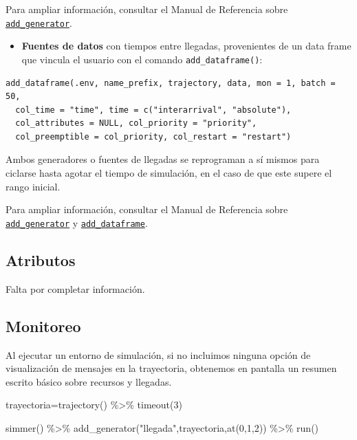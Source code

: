\documentclass[
]{book}
\newenvironment{Shaded}{\begin{snugshade}}{\end{snugshade}}
\newcommand{\DecValTok}[1]{\textcolor[rgb]{0.00,0.00,0.81}{#1}}
\newcommand{\FunctionTok}[1]{\textcolor[rgb]{0.00,0.00,0.00}{#1}}
\newcommand{\NormalTok}[1]{#1}
\newcommand{\OtherTok}[1]{\textcolor[rgb]{0.56,0.35,0.01}{#1}}
\newcommand{\SpecialCharTok}[1]{\textcolor[rgb]{0.00,0.00,0.00}{#1}}
\newcommand{\StringTok}[1]{\textcolor[rgb]{0.31,0.60,0.02}{#1}}
\providecommand{\tightlist}{%
  \setlength{\itemsep}{0pt}\setlength{\parskip}{0pt}}
\theoremstyle{definition}
\theoremstyle{definition}
\theoremstyle{definition}
\theoremstyle{definition}
\theoremstyle{remark}
\begin{document}
Para ampliar información, consultar el Manual de Referencia sobre \href{https://r-simmer.org/reference/generators.html}{\texttt{add\_generator}}.

\begin{itemize}
\tightlist
\item
  \textbf{Fuentes de datos} con tiempos entre llegadas, provenientes de un data frame que vincula el usuario con el comando \texttt{add\_dataframe()}:
\end{itemize}

\begin{verbatim}
add_dataframe(.env, name_prefix, trajectory, data, mon = 1, batch = 50,
  col_time = "time", time = c("interarrival", "absolute"),
  col_attributes = NULL, col_priority = "priority",
  col_preemptible = col_priority, col_restart = "restart")
\end{verbatim}

Ambos generadores o fuentes de llegadas se reprograman a sí mismos para ciclarse hasta agotar el tiempo de simulación, en el caso de que este supere el rango inicial.

Para ampliar información, consultar el Manual de Referencia sobre \href{https://r-simmer.org/reference/add_generator.html}{\texttt{add\_generator}} y \href{https://r-simmer.org/reference/add_dataframe.html}{\texttt{add\_dataframe}}.

\hypertarget{atributos}{%
\subsection{Atributos}\label{atributos}}

Falta por completar información.

\hypertarget{monitoreo}{%
\subsection{Monitoreo}\label{monitoreo}}

Al ejecutar un entorno de simulación, si no incluimos ninguna opción de visualización de mensajes en la trayectoria, obtenemos en pantalla un resumen escrito básico sobre recursos y llegadas.

\begin{Shaded}
\begin{Highlighting}[]
\NormalTok{trayectoria}\OtherTok{=}\FunctionTok{trajectory}\NormalTok{() }\SpecialCharTok{\%\textgreater{}\%}
   \FunctionTok{timeout}\NormalTok{(}\DecValTok{3}\NormalTok{)}

\FunctionTok{simmer}\NormalTok{() }\SpecialCharTok{\%\textgreater{}\%}
  \FunctionTok{add\_generator}\NormalTok{(}\StringTok{"llegada"}\NormalTok{,trayectoria,}\FunctionTok{at}\NormalTok{(}\DecValTok{0}\NormalTok{,}\DecValTok{1}\NormalTok{,}\DecValTok{2}\NormalTok{)) }\SpecialCharTok{\%\textgreater{}\%}
  \FunctionTok{run}\NormalTok{() }
\end{Highlighting}
\end{Shaded}
\end{document}
